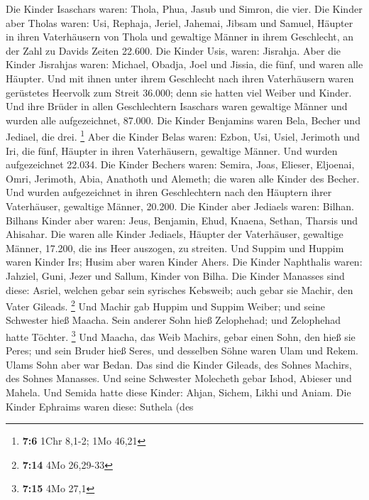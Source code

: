  Die Kinder Isaschars waren: Thola, Phua, Jasub und
Simron, die vier.  Die Kinder aber Tholas waren: Usi,
Rephaja, Jeriel, Jahemai, Jibsam und Samuel, Häupter in ihren
Vaterhäusern von Thola und gewaltige Männer in ihrem Geschlecht, an der
Zahl zu Davids Zeiten 22.600.  Die Kinder Usis, waren:
Jisrahja. Aber die Kinder Jisrahjas waren: Michael, Obadja, Joel und
Jissia, die fünf, und waren alle Häupter.  Und mit ihnen
unter ihrem Geschlecht nach ihren Vaterhäusern waren gerüstetes Heervolk
zum Streit 36.000; denn sie hatten viel Weiber und Kinder.
 Und ihre Brüder in allen Geschlechtern Isaschars waren
gewaltige Männer und wurden alle aufgezeichnet, 87.000. 
Die Kinder Benjamins waren Bela, Becher und Jediael, die drei.
\footnote{\textbf{7:6} 1Chr 8,1-2; 1Mo 46,21}  Aber die
Kinder Belas waren: Ezbon, Usi, Usiel, Jerimoth und Iri, die fünf,
Häupter in ihren Vaterhäusern, gewaltige Männer. Und wurden
aufgezeichnet 22.034.  Die Kinder Bechers waren: Semira,
Joas, Elieser, Eljoenai, Omri, Jerimoth, Abia, Anathoth und Alemeth; die
waren alle Kinder des Becher.  Und wurden aufgezeichnet in
ihren Geschlechtern nach den Häuptern ihrer Vaterhäuser, gewaltige
Männer, 20.200.  Die Kinder aber Jediaels waren: Bilhan.
Bilhans Kinder aber waren: Jeus, Benjamin, Ehud, Knaena, Sethan, Tharsis
und Ahisahar.  Die waren alle Kinder Jediaels, Häupter
der Vaterhäuser, gewaltige Männer, 17.200, die ins Heer auszogen, zu
streiten.  Und Suppim und Huppim waren Kinder Irs; Husim
aber waren Kinder Ahers.  Die Kinder Naphthalis waren:
Jahziel, Guni, Jezer und Sallum, Kinder von Bilha.  Die
Kinder Manasses sind diese: Asriel, welchen gebar sein syrisches
Kebsweib; auch gebar sie Machir, den Vater Gileads. \footnote{\textbf{7:14}
  4Mo 26,29-33}  Und Machir gab Huppim und Suppim Weiber;
und seine Schwester hieß Maacha. Sein anderer Sohn hieß Zelophehad; und
Zelophehad hatte Töchter. \footnote{\textbf{7:15} 4Mo 27,1}
 Und Maacha, das Weib Machirs, gebar einen Sohn, den hieß
sie Peres; und sein Bruder hieß Seres, und desselben Söhne waren Ulam
und Rekem.  Ulams Sohn aber war Bedan. Das sind die
Kinder Gileads, des Sohnes Machirs, des Sohnes Manasses. 
Und seine Schwester Molecheth gebar Ishod, Abieser und Mahela.
 Und Semida hatte diese Kinder: Ahjan, Sichem, Likhi und
Aniam.  Die Kinder Ephraims waren diese: Suthela (des
